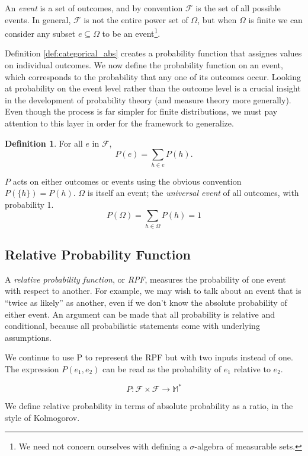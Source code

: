 \documentclass[twoside]{article}
\newcommand{\quotes}[1]{``#1''}
\theoremstyle{plain}%
\theoremstyle{definition}
\newtheorem{definition}{Definition}[section]
\theoremstyle{remark}
\begin{document}
An \textit{event} is a set of outcomes, and by convention \(\mathcal{F}\) is the set of all possible events. In general, \(\mathcal{F}\) is not the entire power set of \(\Omega\), but when \(\Omega\) is finite we can consider any subset \(e \subseteq \Omega\) to be an event\footnote{We need not concern ourselves with defining a \(\sigma\)-algebra of measurable sets.}.

Definition \ref{def:categorical_abs} creates a probability function that assignes values on individual outcomes. We now define the probability function on an event, which corresponds to the probability that any one of its outcomes occur. Looking at probability on the event level rather than the outcome level is a crucial insight in the development of probability theory (and measure theory more generally). Even though the process is far simpler for finite distributions, we must pay attention to this layer in order for the framework to generalize. 

\begin{definition}
For all \(e\) in \(\mathcal{F}\), \[P(e) = \sum_{h \in e}{P(h)}.\]
\end{definition}

\(P\) acts on either outcomes or events using the obvious convention \(P(\{h\}) = P(h)\). \(\Omega\) is itself an event; the \textit{universal event} of all outcomes, with probability 1. \[P(\Omega) = \sum_{h \in \Omega}{P(h)} = 1\]

\subsection{Relative Probability Function}
\label{section:standard_relative_prob}

A \textit{relative probability function}, or \textit{RPF}, measures the probability of one event with respect to another. For example, we may wish to talk about an event that is \quotes{twice as likely} as another, even if we don't know the absolute probability of either event. An argument can be made that all probability is relative and conditional, because all probabilistic statements come with underlying assumptions.

We continue to use P to represent the RPF but with two inputs instead of one. The expression \(P(e_1, e_2)\) can be read as the probability of \(e_1\) relative to \(e_2\).

\[P: \mathcal{F} \times \mathcal{F} \rightarrow \mathbb{M}^*\]

We define relative probability in terms of absolute probability as a ratio, in the style of Kolmogorov.
\end{document}
